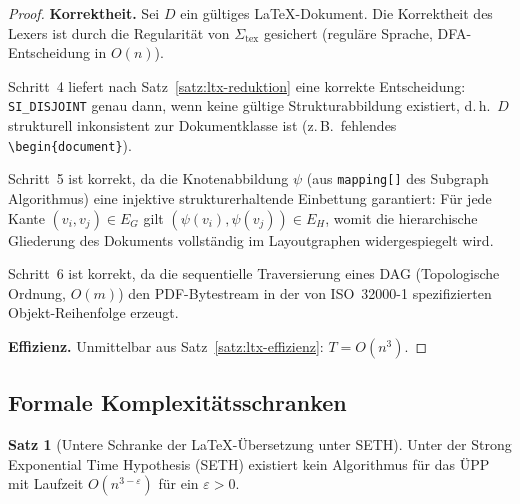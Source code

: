 ﻿\documentclass[a4paper,12pt]{article}
\theoremstyle{definition}
\newtheorem{satz}{Satz}
\begin{document}
\begin{proof}
	\textbf{Korrektheit.}
	Sei $D$ ein gültiges \LaTeX-Dokument. Die Korrektheit des Lexers ist
	durch die Regularität von $\Sigma_{\mathrm{tex}}$ gesichert
	(reguläre Sprache, DFA-Entscheidung in $O(n)$).
	
	Schritt~4 liefert nach Satz~\ref{satz:ltx-reduktion} eine korrekte
	Entscheidung: \texttt{SI\_DISJOINT} genau dann, wenn keine gültige
	Strukturabbildung existiert, d.\,h.\ $D$ strukturell inkonsistent
	zur Dokumentklasse ist (z.\,B.\ fehlendes \texttt{\textbackslash begin\{document\}}).
	
	Schritt~5 ist korrekt, da die Knotenabbildung $\psi$
	(aus \texttt{mapping[]} des Subgraph Algorithmus) eine injektive
	strukturerhaltende Einbettung garantiert: Für jede Kante
	$(v_i, v_j) \in E_G$ gilt $(\psi(v_i), \psi(v_j)) \in E_H$, womit
	die hierarchische Gliederung des Dokuments vollständig im Layoutgraphen
	widergespiegelt wird.
	
	Schritt~6 ist korrekt, da die sequentielle Traversierung eines DAG
	(Topologische Ordnung, $O(m)$) den PDF-Bytestream in der von
	ISO~32000-1 spezifizierten Objekt-Reihenfolge erzeugt.
	
	\medskip
	\textbf{Effizienz.} Unmittelbar aus Satz~\ref{satz:ltx-effizienz}:
	$T = O(n^3)$.
\end{proof}

\subsection{Formale Komplexitätsschranken}
\label{sec:ltx-komplexitaet}

\begin{satz}[Untere Schranke der \LaTeX-Übersetzung unter SETH]
	\label{satz:ltx-seth}
	Unter der Strong Exponential Time Hypothesis (SETH) existiert kein
	Algorithmus für das ÜPP mit Laufzeit $O(n^{3 - \varepsilon})$ für
	ein $\varepsilon > 0$.
\end{satz}
\end{document}
